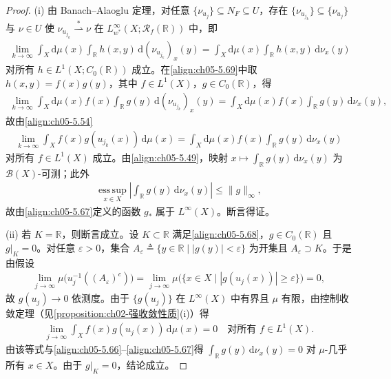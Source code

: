 \documentclass[../../main.tex]{subfiles}%
\begin{document}
\begin{proof}
(i) 由 Banach–Alaoglu 定理，对任意 $\{\nu_{u_j}\}\subseteq N_F\subseteq U$，存在 $\{\nu_{u_{j_k}}\}\subseteq\{\nu_{u_j}\}$ 与 $\nu\in U$ 使 $\nu_{u_{j_k}}\stackrel{*}{\rightharpoonup}\nu$ 在 $L^\infty_{w^*}(X;\mathscr{R}_f(\mathbb{R}))$ 中，即
\begin{align}
\lim_{k\to\infty}\int_X\mathrm{d}\mu(x)\int_{\mathbb{R}}h(x,y)\,\mathrm{d}(\nu_{u_{j_k}})_x(y)
=\int_X\mathrm{d}\mu(x)\int_{\mathbb{R}}h(x,y)\,\mathrm{d}\nu_x(y)\label{align:ch05-5.69}
\end{align}
对所有 $h\in L^1(X;C_0(\mathbb{R}))$ 成立。在\eqref{align:ch05-5.69}中取 $h(x,y)=f(x)g(y)$，其中 $f\in L^1(X)$，$g\in C_0(\mathbb{R})$，得
\begin{align*}
\lim_{k\to\infty}\int_X\mathrm{d}\mu(x)f(x)\int_{\mathbb{R}}g(y)\,\mathrm{d}(\nu_{u_{j_k}})_x(y)
=\int_X\mathrm{d}\mu(x)f(x)\int_{\mathbb{R}}g(y)\,\mathrm{d}\nu_x(y),
\end{align*}
故由\eqref{align:ch05-5.54}
\begin{align*}
\lim_{k\to\infty}\int_Xf(x)g(u_{j_k}(x))\,\mathrm{d}\mu(x)
=\int_X\mathrm{d}\mu(x)f(x)\int_{\mathbb{R}}g(y)\,\mathrm{d}\nu_x(y)
\end{align*}
对所有 $f\in L^1(X)$ 成立。由\eqref{align:ch05-5.49}，映射 $x\mapsto\int_{\mathbb{R}}g(y)\,\mathrm{d}\nu_x(y)$ 为 $\mathscr{B}(X)$-可测；此外
\begin{align*}
\operatorname*{ess\,sup}_{x\in X}\left|\int_{\mathbb{R}}g(y)\,\mathrm{d}\nu_x(y)\right|\leqslant\|g\|_\infty,
\end{align*}
故由\eqref{align:ch05-5.67}定义的函数 $g_*$ 属于 $L^\infty(X)$。断言得证。

(ii) 若 $K=\mathbb{R}$，则断言成立。设 $K\subset\mathbb{R}$ 满足\eqref{align:ch05-5.68}，$g\in C_0(\mathbb{R})$ 且 $g|_K=0$。对任意 $\varepsilon>0$，集合 $A_\varepsilon\triangleq\{y\in\mathbb{R}\mid|g(y)|<\varepsilon\}$ 为开集且 $A_\varepsilon\supset K$。于是由假设
\begin{align*}
\lim_{j\to\infty}\mu\big(u_j^{-1}((A_\varepsilon)^c)\big)
=\lim_{j\to\infty}\mu\big(\{x\in X\mid|g(u_j(x))|\geqslant\varepsilon\}\big)=0,
\end{align*}
故 $g(u_j)\to0$ 依测度。由于 $\{g(u_j)\}$ 在 $L^\infty(X)$ 中有界且 $\mu$ 有限，由控制收敛定理（见\cref{proposition:ch02-强收敛性质}(i)）得
\begin{align*}
\lim_{j\to\infty}\int_Xf(x)g(u_j(x))\,\mathrm{d}\mu(x)=0\quad\text{对所有 }f\in L^1(X).
\end{align*}
由该等式与\eqref{align:ch05-5.66}–\eqref{align:ch05-5.67}得 $\int_{\mathbb{R}}g(y)\,\mathrm{d}\nu_x(y)=0$ 对 $\mu$-几乎所有 $x\in X$。由于 $g|_K=0$，结论成立。
\end{proof}
\end{document}
